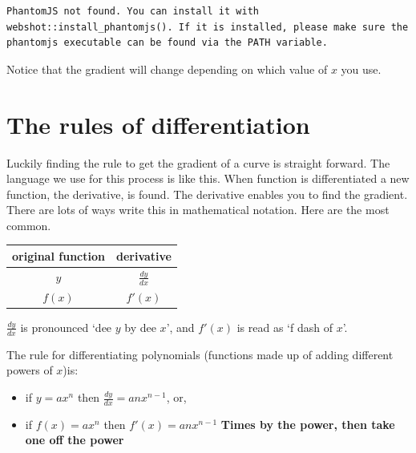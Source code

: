 \documentclass[
  a4paper,
]{scrbook}
\newcounter{none} %
\providecommand{\tightlist}{%
  \setlength{\itemsep}{0pt}\setlength{\parskip}{0pt}}
\begin{document}
\begin{verbatim}
PhantomJS not found. You can install it with webshot::install_phantomjs(). If it is installed, please make sure the phantomjs executable can be found via the PATH variable.
\end{verbatim}

Notice that the gradient will change depending on which value of \(x\)
you use.

\section{The rules of
differentiation}\label{the-rules-of-differentiation}

Luckily finding the rule to get the gradient of a curve is straight
forward. The language we use for this process is like this. When
function is differentiated a new function, the derivative, is found. The
derivative enables you to find the gradient. There are lots of ways
write this in mathematical notation. Here are the most common.

{\def\LTcaptype{none} %
\begin{longtable}[]{@{}cc@{}}
\toprule\noalign{}
original function & derivative \\
\midrule\noalign{}
\endhead
\bottomrule\noalign{}
\endlastfoot
\(y\) & \(\frac{dy}{dx}\) \\
\(f(x)\) & \(f'(x)\) \\
\end{longtable}
}

\(\frac{dy}{dx}\) is pronounced `dee \(y\) by dee \(x\)', and \(f'(x)\)
is read as `f dash of \(x\)'.

The rule for differentiating polynomials (functions made up of adding
different powers of \(x\))is:

\begin{tcolorbox}[enhanced jigsaw, arc=.35mm, bottomrule=.15mm, bottomtitle=1mm, breakable, colback=white, colbacktitle=quarto-callout-note-color!10!white, colframe=quarto-callout-note-color-frame, coltitle=black, left=2mm, leftrule=.75mm, opacityback=0, opacitybacktitle=0.6, rightrule=.15mm, title=\textcolor{quarto-callout-note-color}{\faInfo}\hspace{0.5em}{Note}, titlerule=0mm, toprule=.15mm, toptitle=1mm]

\begin{itemize}
\tightlist
\item
  if \(y=ax^n\) then \(\frac{dy}{dx} = anx^{n-1}\), or,
\item
  if \(f(x)=ax^n\) then \(f'(x) = anx^{n-1}\) \textbf{Times by the
  power, then take one off the power}
\end{itemize}

\end{tcolorbox}
\end{document}
